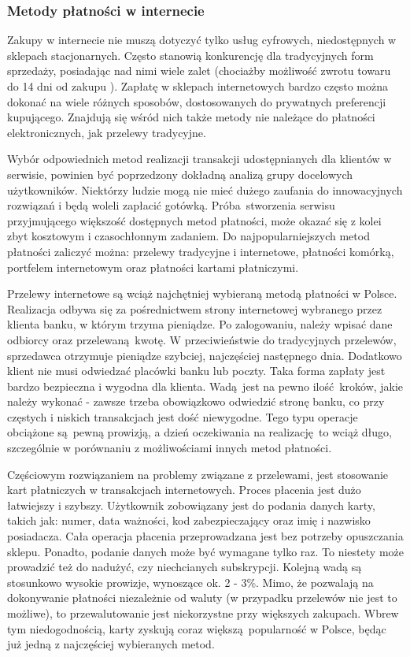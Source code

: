 \subsubsection*{Metody płatności w internecie}
Zakupy w internecie nie muszą dotyczyć tylko usług cyfrowych, niedostępnych w  sklepach stacjonarnych. Często stanowią konkurencję dla tradycyjnych form sprzedaży, posiadając nad nimi wiele zalet (chociażby możliwość zwrotu towaru do 14 dni od zakupu \cite{wszystko_o_platnosciach}). Zapłatę w sklepach internetowych bardzo często można dokonać na wiele różnych sposobów, dostosowanych do prywatnych preferencji kupującego. Znajdują się wśród nich także metody nie należące do płatności elektronicznych, jak przelewy tradycyjne.

Wybór odpowiednich metod realizacji transakcji udostępnianych dla klientów w serwisie, powinien być poprzedzony dokładną analizą grupy docelowych użytkowników. Niektórzy ludzie mogą nie mieć dużego zaufania do innowacyjnych rozwiązań i będą woleli zapłacić gotówką. Próba stworzenia serwisu przyjmującego większość dostępnych metod płatności, może okazać się z kolei zbyt kosztowym i czasochłonnym zadaniem. Do najpopularniejszych metod płatności zaliczyć można: przelewy tradycyjne i internetowe, płatności komórką, portfelem internetowym oraz płatności kartami płatniczymi.

Przelewy internetowe są wciąż najchętniej wybieraną metodą płatności w Polsce. Realizacja odbywa się za pośrednictwem strony internetowej wybranego przez klienta banku, w którym trzyma pieniądze. Po zalogowaniu, należy wpisać dane odbiorcy oraz przelewaną kwotę. W przeciwieństwie do tradycyjnych przelewów, sprzedawca otrzymuje pieniądze szybciej, najczęściej następnego dnia. Dodatkowo klient nie musi odwiedzać placówki banku lub poczty. Taka forma zapłaty jest bardzo bezpieczna i wygodna dla klienta. Wadą jest na pewno ilość kroków, jakie należy wykonać - zawsze trzeba obowiązkowo odwiedzić stronę banku, co przy częstych i niskich transakcjach jest dość niewygodne. Tego typu operacje obciążone są pewną prowizją, a dzień oczekiwania na realizację to wciąż długo, szczególnie w porównaniu z możliwościami innych metod płatności.

Częściowym rozwiązaniem na problemy związane z przelewami, jest stosowanie kart płatniczych w transakcjach internetowych. Proces płacenia jest dużo łatwiejszy i szybszy. Użytkownik zobowiązany jest do podania danych karty, takich jak: numer, data ważności, kod zabezpieczający oraz imię i nazwisko posiadacza. Cała operacja płacenia przeprowadzana jest bez potrzeby opuszczania sklepu. Ponadto, podanie danych może być wymagane tylko raz. To niestety może prowadzić też do nadużyć, czy niechcianych subskrypcji. Kolejną wadą są stosunkowo wysokie prowizje, wynoszące ok. 2 - 3\%. Mimo, że pozwalają na dokonywanie płatności niezależnie od waluty (w przypadku przelewów nie jest to możliwe), to przewalutowanie jest niekorzystne przy większych zakupach. Wbrew tym niedogodnością, karty zyskują coraz większą popularność w Polsce, będąc już jedną z najczęściej wybieranych metod.

